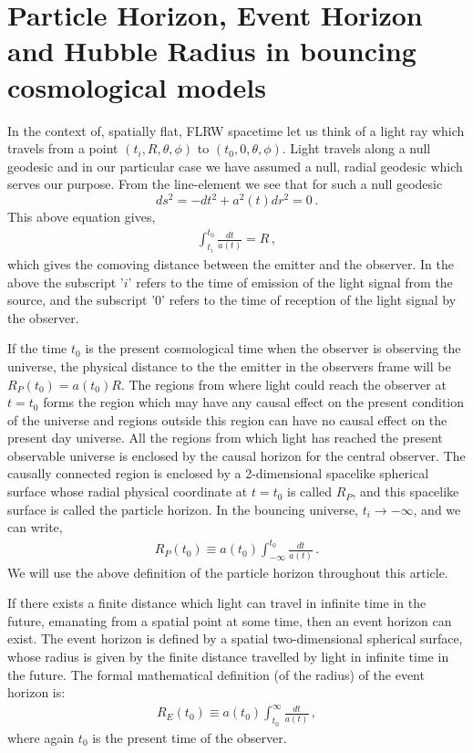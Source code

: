 \documentclass[24pt]{article}
\begin{document}
\section{Particle Horizon, Event Horizon and Hubble Radius in bouncing
cosmological models}
\label{pheh}

In the context of, spatially flat, FLRW spacetime let us think of a
light ray which travels from a point $(t_i,R,\theta,\phi)$ to
$(t_0,0,\theta,\phi)$. Light travels along a null geodesic and in our
particular case we have assumed a null, radial geodesic which serves
our purpose. From the line-element we see that for such a null
geodesic
$$ds^2 = -dt^2 + a^2(t) dr^2= 0\,.$$
This above equation gives,
\begin{eqnarray}
\int_{t_i}^{t_0} \frac{dt}{a(t)} = R\,,
\label{tr}
\end{eqnarray}
which gives the comoving distance between the emitter and the
observer. In the above the subscript '$i$' refers to the time of
emission of the light signal from the source, and the subscript '$0$'
refers to the time of reception of the light signal by the
observer.

If the time $t_0$ is the present cosmological time when the observer
is observing the universe, the physical distance to the the emitter in
the observers frame will be $R_P(t_0) = a(t_0) R$.  The regions from
where light could reach the observer at $t=t_0$ forms the region which
may have any causal effect on the present condition of the universe
and regions outside this region can have no causal effect on the
present day universe. All the regions from which light has reached the
present observable universe is enclosed by the causal horizon for the
central observer. The causally connected region is enclosed by a
2-dimensional spacelike spherical surface whose radial physical
coordinate at $t=t_0$ is called $R_P$, and this spacelike surface is
called the particle horizon.  In the bouncing universe, $t_i \to
-\infty$, and we can write,
\begin{eqnarray}
R_P(t_0) \equiv a(t_0)\int_{-\infty}^{t_0} \frac{dt}{a(t)}\,. 
\label{pht}
\end{eqnarray}
We will use the above definition of the particle horizon throughout
this article.

If there exists a finite distance which light can travel in infinite
time in the future, emanating from a spatial point at some time, then
an event horizon can exist. The event horizon is defined by a spatial
two-dimensional spherical surface, whose radius is given by the
finite distance travelled by light in infinite time in the future.
The formal mathematical definition (of the radius) of the event
horizon is:
\begin{eqnarray}
R_E(t_0) \equiv a(t_0)\int_{t_0}^{\infty} \frac{dt}{a(t)}\,,
\label{eht}
\end{eqnarray}
where again $t_0$ is the present time of the observer. 
\end{document}
